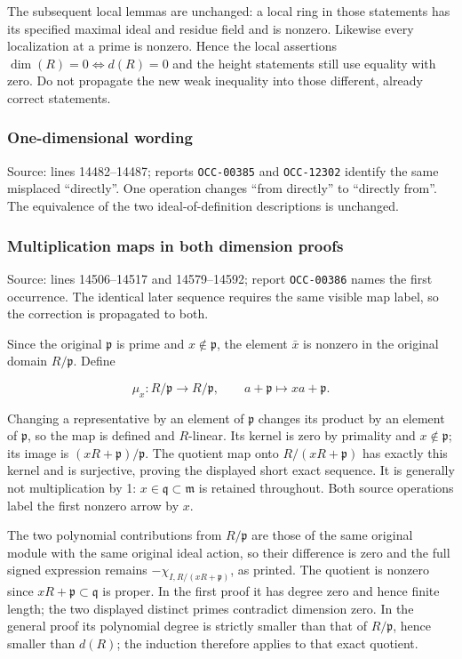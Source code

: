The subsequent local lemmas are unchanged: a local ring in those statements has its specified maximal ideal and residue field and is nonzero. Likewise every localization at a prime is nonzero. Hence the local assertions \(\dim(R)=0\iff d(R)=0\) and the height statements still use equality with zero. Do not propagate the new weak inequality into those different, already correct statements.

\subsubsection{One-dimensional wording}\label{algebra-proof-003-one-dimensional-wording}

Source: lines 14482--14487; reports \texttt{OCC-00385} and \texttt{OCC-12302} identify the same misplaced ``directly''. One operation changes ``from directly'' to ``directly from''. The equivalence of the two ideal-of-definition descriptions is unchanged.

\subsubsection{Multiplication maps in both dimension proofs}\label{algebra-proof-003-multiplication-maps-in-both-dimension-proofs}

Source: lines 14506--14517 and 14579--14592; report \texttt{OCC-00386} names the first occurrence. The identical later sequence requires the same visible map label, so the correction is propagated to both.

Since the original \(\mathfrak p\) is prime and \(x\notin\mathfrak p\), the element \(\bar x\) is nonzero in the original domain \(R/\mathfrak p\). Define

\[
\mu_x:R/\mathfrak p\longrightarrow R/\mathfrak p,
\qquad a+\mathfrak p\longmapsto xa+\mathfrak p.
\]

Changing a representative by an element of \(\mathfrak p\) changes its product by an element of \(\mathfrak p\), so the map is defined and \(R\)-linear. Its kernel is zero by primality and \(x\notin\mathfrak p\); its image is \((xR+\mathfrak p)/\mathfrak p\). The quotient map onto \(R/(xR+\mathfrak p)\) has exactly this kernel and is surjective, proving the displayed short exact sequence. It is generally not multiplication by 1: \(x\in\mathfrak q\subset\mathfrak m\) is retained throughout. Both source operations label the first nonzero arrow by \(x\).

The two polynomial contributions from \(R/\mathfrak p\) are those of the same original module with the same original ideal action, so their difference is zero and the full signed expression remains \(-\chi_{I,R/(xR+\mathfrak p)}\), as printed. The quotient is nonzero since \(xR+\mathfrak p\subset\mathfrak q\) is proper. In the first proof it has degree zero and hence finite length; the two displayed distinct primes contradict dimension zero. In the general proof its polynomial degree is strictly smaller than that of \(R/\mathfrak p\), hence smaller than \(d(R)\); the induction therefore applies to that exact quotient.

